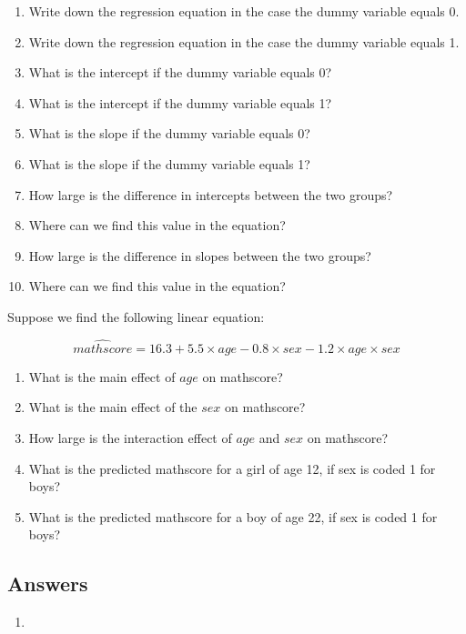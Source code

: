 \documentclass[]{book}\usepackage[]{graphicx}\usepackage[]{color}
\begin{document}
\begin{enumerate}


\item 
Write down the regression equation in the case the dummy variable equals 0.
\item Write down the regression equation in the case the dummy variable equals 1.
\item What is the intercept if the dummy variable equals 0?
\item What is the intercept if the dummy variable equals 1?
\item What is the slope if the dummy variable equals 0?
\item What is the slope if the dummy variable equals 1?
\item How large is the difference in intercepts between the two groups? 
\item Where can we find this value in the equation?
\item How large is the difference in slopes between the two groups?\
\item Where can we find this value in the equation?
\end{enumerate}
Suppose we find the following linear equation:

\begin{equation} 
\widehat{mathscore} = 16.3 + 5.5  \times age - 0.8  \times sex - 1.2  \times age  \times sex  \nonumber
\end{equation}
\begin{enumerate}

\item 
What is the main effect of $age$ on mathscore? 
\item What is the main effect of the $sex$ on mathscore?
\item How large is the interaction effect of $age$ and $sex$ on mathscore?
\item What is the predicted mathscore for a girl of age 12, if sex is coded 1 for boys?
\item What is the predicted mathscore for a boy of age 22, if sex is coded 1 for boys?

\end{enumerate}

\subsection{Answers}
\begin{enumerate}
\item 
\end{enumerate}
\end{document}
